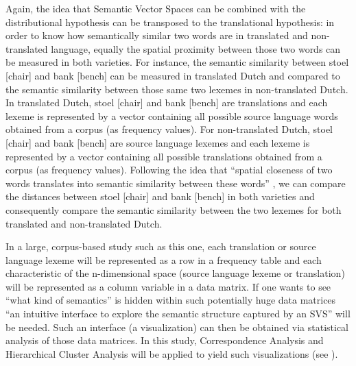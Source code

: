 Again, the idea that Semantic Vector Spaces can be combined with the distributional hypothesis can be transposed to the translational hypothesis: in order to know how semantically similar two words are in translated and non-translated language, equally the spatial proximity between those two words can be measured in both varieties. For instance, the semantic similarity between stoel [chair] and bank [bench] can be measured in translated Dutch and compared to the semantic similarity between those same two lexemes in non-translated Dutch. In translated Dutch, stoel [chair] and bank [bench] are translations and each lexeme is represented by a vector containing all possible source language words obtained from a corpus (as frequency values). For non-translated Dutch, stoel [chair] and bank [bench] are source language lexemes and each lexeme is represented by a vector containing all possible translations obtained from a corpus (as frequency values). Following the idea that “spatial closeness of two words translates into semantic similarity between these words” \citep[213]{szmrecsanyi_semantic_2014}, we can compare the distances between stoel [chair] and bank [bench] in both varieties and consequently compare the semantic similarity between the two lexemes for both translated and non-translated Dutch. 

In a large, corpus-based study such as this one, each translation or source language lexeme will be represented as a row in a frequency table and each characteristic of the n-dimensional space (source language lexeme or translation) will be represented as a column variable in a data matrix. If one wants to see “what kind of semantics” \citep[17]{heylen_looking_2012} is hidden within such potentially huge data matrices “an intuitive interface to explore the semantic structure captured by an SVS” \citep[17]{heylen_looking_2012} will be needed. Such an interface (a visualization) can then be obtained via statistical analysis of those data matrices. In this study, Correspondence Analysis and Hierarchical Cluster Analysis will be applied to yield such visualizations (see ).

